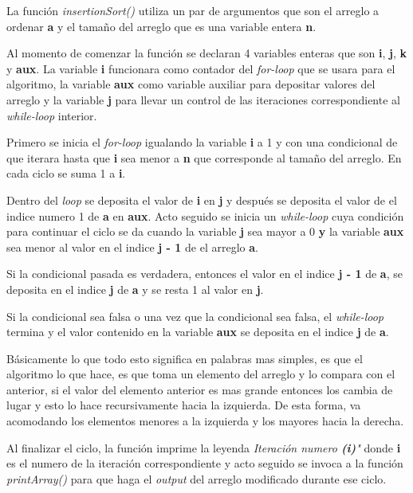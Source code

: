 \documentclass{article}
\begin{document}
\begin{itemize}
				La función \emph{insertionSort()} utiliza un par de argumentos que son el arreglo a ordenar \textbf{a} y el tamaño del arreglo que es una variable entera \textbf{n}.
				
				Al momento de comenzar la función se declaran 4 variables enteras que son \textbf{i}, \textbf{j}, \textbf{k} y \textbf{aux}. La variable \textbf{i} funcionara como contador del \emph{for-loop} que se usara para el algoritmo, la variable \textbf{aux} como variable auxiliar para depositar valores del arreglo y la variable \textbf{j} para llevar un control de las iteraciones correspondiente al \emph{while-loop} interior.
				
				Primero se inicia el \emph{for-loop} igualando la variable \textbf{i} a 1 y con una condicional de que iterara hasta que \textbf{i} sea menor a \textbf{n} que corresponde al tamaño del arreglo. En cada ciclo se suma 1 a \textbf{i}.
				
				Dentro del \emph{loop} se deposita el valor de \textbf{i} en \textbf{j} y después se deposita el valor de el indice numero 1 de \textbf{a} en \textbf{aux}. Acto seguido se inicia un \emph{while-loop} cuya condición para continuar el ciclo se da cuando la variable \textbf{j} sea mayor a 0 \textbf{y} la variable \textbf{aux} sea menor al valor en el indice \textbf{j - 1} de el arreglo \textbf{a}.
				
				Si la condicional pasada es verdadera, entonces el valor en el indice \textbf{j - 1} de \textbf{a}, se deposita en el indice \textbf{j} de \textbf{a} y se resta 1 al valor en \textbf{j}.
				
				Si la condicional sea falsa o una vez que la condicional sea falsa, el \emph{while-loop} termina y el valor contenido en la variable \textbf{aux} se deposita en el indice \textbf{j} de \textbf{a}.
				
				Básicamente lo que todo esto significa en palabras mas simples, es que el algoritmo lo que hace, es que toma un elemento del arreglo y lo compara con el anterior, si el valor del elemento anterior es mas grande entonces los cambia de lugar y esto lo hace recursivamente hacia la izquierda. De esta forma, va acomodando los elementos menores a la izquierda y los mayores hacia la derecha.
				
				Al finalizar el ciclo, la función imprime la leyenda \emph{Iteración numero \textbf{(i)}"} donde \textbf{i} es el numero de la iteración correspondiente y acto seguido se invoca a la función \emph{printArray()} para que haga el \emph{output} del arreglo modificado durante ese ciclo.
				

\end{itemize}
\end{document}

